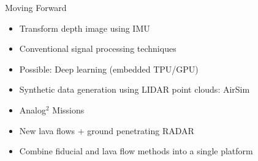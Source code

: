 \documentclass[aspectratio=169]{beamer}
\begin{document}

\begin{frame}{Moving Forward}
	\begin{itemize}
		\item Transform depth image using IMU
		\item Conventional signal processing techniques
		\item Possible: Deep learning (embedded TPU/GPU)
		\item Synthetic data generation using LIDAR point clouds: AirSim
		\item Analog$^2$ Missions
		\item New lava flows + ground penetrating RADAR
		\item Combine fiducial and lava flow methods into a single platform
	\end{itemize}
\end{frame}
\end{document}
